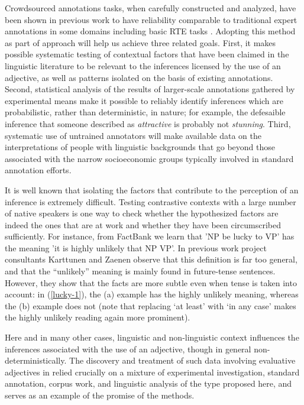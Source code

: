 \documentclass[10pt]{article}
\begin{document}
Crowdsourced annotations tasks, when carefully constructed and analyzed, have been shown in previous work to have reliability comparable to traditional expert annotations in some domains including basic RTE tasks \cite{snow2008cheap}. Adopting this method as part of  approach will help us achieve three related goals. First, it makes possible systematic testing of contextual factors that have been claimed in the linguistic literature to be relevant to the inferences licensed by the use of an adjective, as well as patterns isolated on the basis of existing annotations. Second, statistical analysis of the results of larger-scale annotations gathered by experimental means make it possible to reliably identify inferences which are probabilistic, rather than deterministic, in nature; for example, the defesaible inference that someone described as \emph{attractive} is probably not \emph{stunning}. Third, systematic use of untrained annotators will make available data on the interpretations of people with linguistic backgrounds that go beyond those associated with the narrow socioeconomic groups typically involved in standard annotation efforts. 

It is well known that isolating the factors that contribute to the perception of an inference is extremely difficult. Testing contrastive contexts with a large number of native speakers is one way to check whether the hypothesized factors are indeed the ones that are at work and whether they have been circumscribed sufficiently. For instance, from FactBank we learn that 'NP be lucky to VP' has the meaning 'it is highly unlikely that NP VP'. In previous work project consultants Karttunen and Zaenen \cite{karttunen:2012b,zaenen+karttunen:2013} observe that this definition is far too general, and that the ``unlikely'' meaning is mainly found in future-tense sentences. However, they show that the facts are more subtle even when tense is taken into account: in (\ref{lucky-1}), the (a) example has the highly unlikely meaning, whereas the (b) example does not (note that replacing `at least' with `in any case' makes the highly unlikely reading again more prominent).


\noindent Here and in many other cases, linguistic and non-linguistic context influences the inferences associated with the use of an adjective, though in general non-deterministically. The discovery and treatment of such data involving evaluative adjectives in \cite{karttunen:2012b,zaenen+karttunen:2013,csli-gang-cssp13} relied crucially on a mixture of experimental investigation, standard annotation, corpus work, and linguistic analysis of the type proposed here, and serves as an example of the promise of the methods. 
\end{document}
